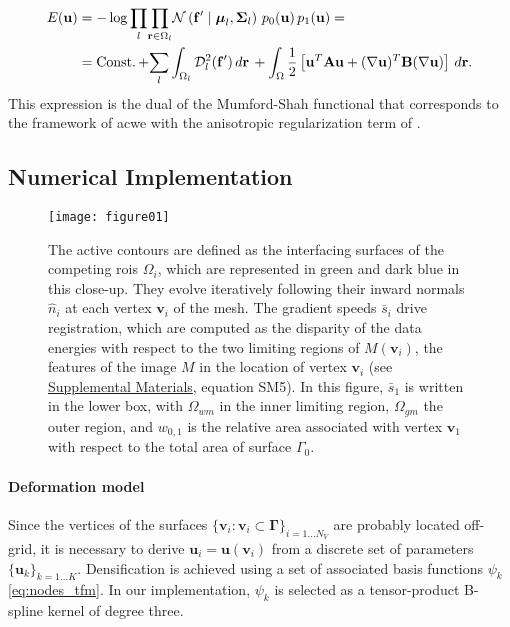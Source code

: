 \documentclass[3p,authoryear,fleqn]{elsarticle}
\DeclareMathOperator{\const}{Const.}
\providecommand{\mdist}[2]{ \mathcal{D}_{#2}^2(\mathbf{#1}) }
\providecommand{\gammaset}{\ensuremath{\boldsymbol{\Gamma}}}
\renewcommand{\vec}[1]{\mathbf{#1}}
\providecommand{\suppl}[1]{\href{http://figshare.com/s/459c26b4ee8211e493b306ec4bbcf141}{Supplemental Materials}, #1}
\begin{document}
  \begin{align}
  E(\vec{u}) &= -\log \underset{l}{\prod}
  \underset{\vec{r} \in \Omega_l}{\prod}
  \mathcal{N} \left( \vec{f}' \mid \boldsymbol{\mu}_l, \boldsymbol{\Sigma}_l \right)\,p_0( \vec{u})\,p_1( \vec{u}) = \notag\\ &=
  \const + \underset{l}{\sum} \int_{\Omega_l} \mdist{f'}{l} \,d\vec{r} \, +   \int_{\Omega} \frac12 \left[ \vec{u}^T \mathbf{A} \vec{u} + (\nabla \vec{u})^T \mathbf{B} (\nabla \vec{u}) \right] \,d\vec{r}.
  \label{eq:energy}
  \end{align}
This expression is the dual of the Mumford-Shah functional that corresponds
  to the framework of \acrlong*{acwe} \citep{chan_active_2001}
  with the anisotropic regularization term of \cite{nagel_investigation_1986}.


\subsection{Numerical Implementation}
\label{sec:numerical_implementation}

\begin{figure}
  \texttt{[image: figure01]}
  \caption{The active contours are defined as the interfacing surfaces of the competing
    \glspl{roi} $\Omega_i$, which
  are represented in green and dark blue in this close-up.
  They evolve iteratively following their inward normals $\hat{n}_i$ at each vertex
    $\vec{v}_i$ of the mesh.
  The gradient speeds $\bar{s}_i$ drive registration, which are computed as the disparity of the data
    energies with respect to the two limiting regions of $M(\vec{v}_i)$, the features of the image
    $M$ in the location of vertex $\vec{v}_i$ (see \suppl{equation SM5}).
  In this figure, $\bar{s}_1$ is written in the lower
    box, with $\Omega_{wm}$ in the inner limiting region, $\Omega_{gm}$ the outer region, and
    $w_{0,1}$ is the relative area associated with vertex $\vec{v}_1$ with respect to
    the total area of surface $\Gamma_0$.
      }\label{fig:method}
\end{figure}

\paragraph*{Deformation model}\label{sec:deformation_model}
Since the vertices of the surfaces $\{\vec{v}_i: \vec{v}_i \subset \gammaset \}_{i=1 \ldots N_V}$
  are probably located off-grid, it is necessary to derive $\vec{u}_i = \vec{u}(\vec{v}_i)$ from a discrete set of parameters
  $\{\vec{u}_k\}_{k=1 \ldots K}$.
Densification is achieved using a set of associated basis functions $\psi_k$ \eqref{eq:nodes_tfm}.
In our implementation, $\psi_k$ is selected as a tensor-product B-spline kernel
  of degree three.
\end{document}
